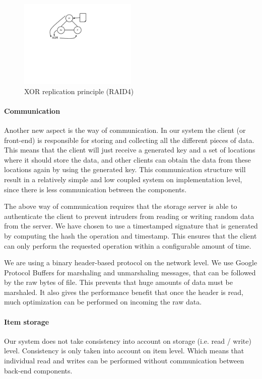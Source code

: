 \documentclass[12pt,a4paper]{scrartcl}
\begin{document}
\begin{figure}[H]
\centering
\includegraphics[width=0.5\textwidth,trim=4cm 8cm 8cm 1cm,clip=true]{diagrams/xor-replication.pdf}
\caption{XOR replication principle (RAID4)}
\label{fig:xor-replication}
\end{figure}

\paragraph{Communication}
Another new aspect is the way of communication. In our system the client (or front-end) is responsible for storing and collecting all the different pieces of data. This means that the client will just receive a generated key and a set of locations where it should store the data, and other clients can obtain the data from these locations again by using the generated key. This communication structure will result in a relatively simple and low coupled system on implementation level, since there is less communication between the components.

The above way of communication requires that the storage server is able to authenticate the client to prevent intruders from reading or writing random data from the server. We have chosen to use a timestamped signature that is generated by computing the hash the operation and timestamp. This ensures that the client can only perform the requested operation within a configurable amount of time.

We are using a binary header-based protocol on the network level. We use Google Protocol Buffers for marshaling and unmarshaling messages, that can be followed by the raw bytes of file. This prevents that huge amounts of data must be marshaled. It also gives the performance benefit that once the header is read, much optimization can be performed on incoming the raw data.

\paragraph{Item storage}
Our system does not take consistency into account on storage (i.e. read / write) level. Consistency is only taken into account on item level. Which means that individual read and writes can be performed without communication between back-end components.
\end{document}
